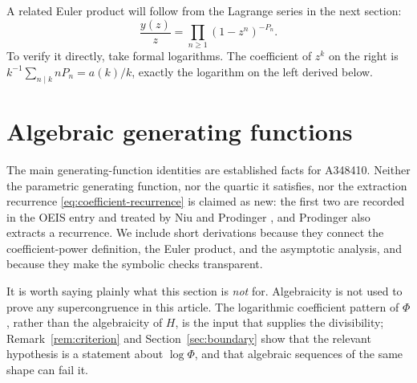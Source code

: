 \documentclass[11pt,a4paper]{article}
\numberwithin{equation}{section}
\theoremstyle{definition}
\theoremstyle{remark}
\begin{document}
A related Euler product will follow from the Lagrange series in the next
section:
\begin{equation}\label{eq:euler-product}
 \frac{y(z)}z=\prod_{n\ge1}(1-z^n)^{-P_n}.
\end{equation}
To verify it directly, take formal logarithms. The coefficient of $z^k$
on the right is $k^{-1}\sum_{n\mid k}nP_n=a(k)/k$, exactly the logarithm
on the left derived below.

\section{Algebraic generating functions}
\label{sec:gf}

The main generating-function identities are established facts for A348410.
Neither the parametric generating function, nor the quartic it satisfies,
nor the extraction recurrence \eqref{eq:coefficient-recurrence} is claimed as
new: the first two are recorded in the OEIS entry \cite{oeis348410} and
treated by Niu \cite{niu} and Prodinger \cite{prodinger}, and Prodinger also
extracts a recurrence. We include short derivations because they connect the
coefficient-power definition, the Euler product, and the asymptotic analysis,
and because they make the symbolic checks transparent.

It is worth saying plainly what this section is \emph{not} for.
Algebraicity is not used to prove any supercongruence in this article. The
logarithmic coefficient pattern of $\Phi$, rather than the algebraicity of
$H$, is the input that supplies the divisibility; Remark~\ref{rem:criterion}
and Section~\ref{sec:boundary} show that the relevant hypothesis is a
statement about $\log\Phi$, and that algebraic sequences of the same shape
can fail it.
\end{document}
